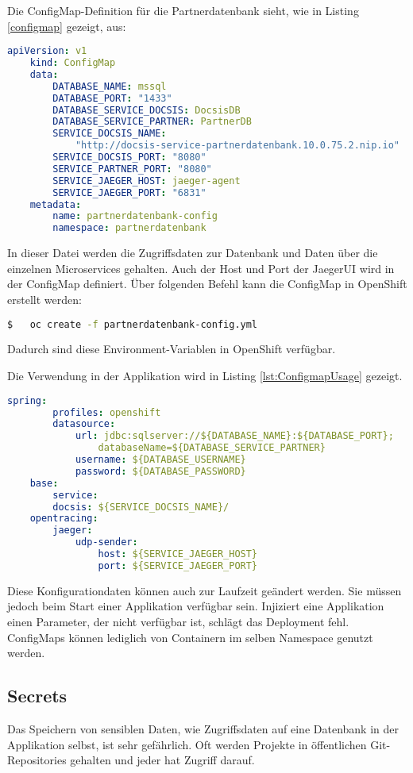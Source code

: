 Die ConfigMap-Definition für die Partnerdatenbank sieht, wie in Listing \ref{configmap} gezeigt, aus:
\begin{lstlisting}[language=yml, caption=partnerdatenbank-config.yml, label=configmap]
	apiVersion: v1
	kind: ConfigMap
	data:
		DATABASE_NAME: mssql
		DATABASE_PORT: "1433"
		DATABASE_SERVICE_DOCSIS: DocsisDB
		DATABASE_SERVICE_PARTNER: PartnerDB
		SERVICE_DOCSIS_NAME: 
			"http://docsis-service-partnerdatenbank.10.0.75.2.nip.io"
		SERVICE_DOCSIS_PORT: "8080"
		SERVICE_PARTNER_PORT: "8080"
		SERVICE_JAEGER_HOST: jaeger-agent
		SERVICE_JAEGER_PORT: "6831"
	metadata:
		name: partnerdatenbank-config
		namespace: partnerdatenbank
\end{lstlisting}

In dieser Datei werden die Zugriffsdaten zur Datenbank und Daten über die einzelnen Microservices gehalten. Auch der Host und Port der JaegerUI wird in der ConfigMap definiert.
Über folgenden Befehl kann die ConfigMap in OpenShift erstellt werden:
\begin{lstlisting}[language=bash]
$	oc create -f partnerdatenbank-config.yml
\end{lstlisting}

Dadurch sind diese Environment-Variablen in OpenShift verfügbar. 

Die Verwendung in der Applikation wird in Listing \ref{lst:ConfigmapUsage} gezeigt.
\begin{lstlisting}[language=yml, caption=application.yml - ConfigMap, label=lst:ConfigmapUsage]
	spring:
		profiles: openshift
		datasource:
			url: jdbc:sqlserver://${DATABASE_NAME}:${DATABASE_PORT};
				databaseName=${DATABASE_SERVICE_PARTNER}
			username: ${DATABASE_USERNAME}
			password: ${DATABASE_PASSWORD}
	base:
		service:
		docsis: ${SERVICE_DOCSIS_NAME}/
	opentracing:
		jaeger:
			udp-sender:
				host: ${SERVICE_JAEGER_HOST}
				port: ${SERVICE_JAEGER_PORT}
\end{lstlisting}

Diese Konfigurationdaten können auch zur Laufzeit geändert werden. Sie müssen jedoch beim Start einer Applikation verfügbar sein. Injiziert eine Applikation einen Parameter, der nicht verfügbar ist, schlägt das Deployment fehl. 
ConfigMaps können lediglich von Containern im selben Namespace genutzt werden. 

\subsection{Secrets}
\label{subsubsec:secrets}
Das Speichern von sensiblen Daten, wie Zugriffsdaten auf eine Datenbank in der Applikation selbst, ist sehr gefährlich. Oft werden Projekte in öffentlichen Git-Repositories gehalten und jeder hat Zugriff darauf. 

